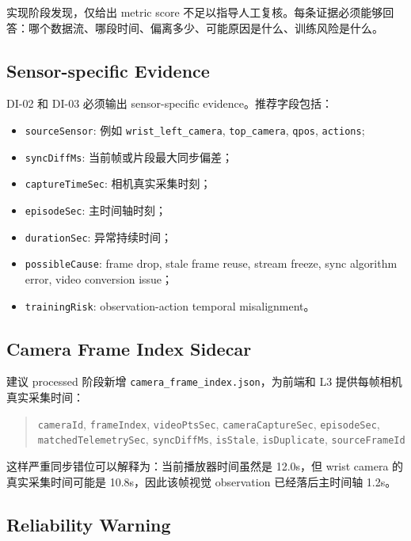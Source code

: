 \documentclass[UTF8,zihao=-4,oneside,openany]{ctexrep}
\newcommand{\Code}[1]{\texttt{#1}}
\begin{document}
实现阶段发现，仅给出 metric score 不足以指导人工复核。每条证据必须能够回答：哪个数据流、哪段时间、偏离多少、可能原因是什么、训练风险是什么。

\subsection*{Sensor-specific Evidence}

DI-02 和 DI-03 必须输出 sensor-specific evidence。推荐字段包括：

\begin{itemize}
\item \Code{sourceSensor}: 例如 \Code{wrist\_left\_camera}, \Code{top\_camera}, \Code{qpos}, \Code{actions};
\item \Code{syncDiffMs}: 当前帧或片段最大同步偏差；
\item \Code{captureTimeSec}: 相机真实采集时刻；
\item \Code{episodeSec}: 主时间轴时刻；
\item \Code{durationSec}: 异常持续时间；
\item \Code{possibleCause}: frame drop, stale frame reuse, stream freeze, sync algorithm error, video conversion issue；
\item \Code{trainingRisk}: observation-action temporal misalignment。
\end{itemize}

\subsection*{Camera Frame Index Sidecar}

建议 processed 阶段新增 \Code{camera\_frame\_index.json}，为前端和 L3 提供每帧相机真实采集时间：

\begin{quote}\small
\Code{cameraId}, \Code{frameIndex}, \Code{videoPtsSec}, \Code{cameraCaptureSec}, \Code{episodeSec}, \Code{matchedTelemetrySec}, \Code{syncDiffMs}, \Code{isStale}, \Code{isDuplicate}, \Code{sourceFrameId}
\end{quote}

这样严重同步错位可以解释为：当前播放器时间虽然是 12.0s，但 wrist camera 的真实采集时间可能是 10.8s，因此该帧视觉 observation 已经落后主时间轴 1.2s。

\subsection*{Reliability Warning}
\end{document}
